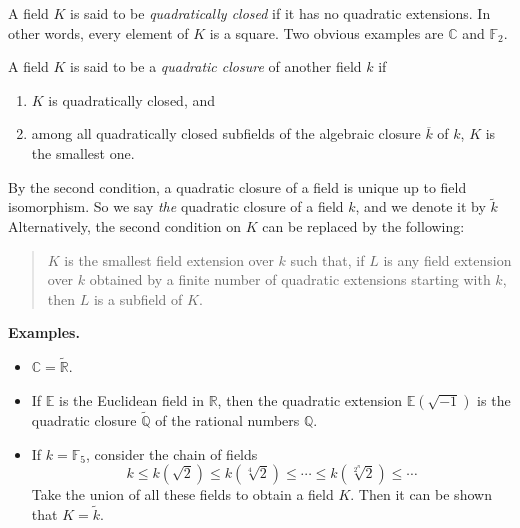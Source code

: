 \documentclass[12pt]{article}
\begin{document}
A field $K$ is said to be \emph{quadratically closed} if it has no quadratic extensions.  In other words, every element of $K$ is a square.  Two obvious examples are $\mathbb{C}$ and $\mathbb{F}_2$.

A field $K$ is said to be a \emph{quadratic closure} of another field $k$ if
\begin{enumerate}
\item $K$ is quadratically closed, and 
\item among all quadratically closed subfields of the algebraic closure $\overline{k}$ of $k$, $K$ is the smallest one.
\end{enumerate}

By the second condition, a quadratic closure of a field is unique up to field isomorphism.  So we say \emph{the} quadratic closure of a field $k$, and we denote it by $\widetilde{k}$ Alternatively, the second condition on $K$ can be replaced by the following:

\begin{quote}
$K$ is the smallest field extension over $k$ such that, if $L$ is any field extension over $k$ obtained by a finite number of quadratic extensions starting with $k$, then $L$ is a subfield of $K$.
\end{quote}

\textbf{Examples.}  
\begin{itemize}
\item $\mathbb{C}=\widetilde{\mathbb{R}}$.  
\item If $\mathbb{E}$ is the Euclidean field in $\mathbb{R}$, then the quadratic extension $\mathbb{E}(\sqrt{-1})$ is the quadratic closure $\widetilde{\mathbb{Q}}$ of the rational numbers $\mathbb{Q}$.
\item If $k=\mathbb{F}_5$, consider the chain of fields
$$k\le k(\sqrt{2})\le k(\sqrt[4]{2})\le \cdots \le k(\sqrt[2^n]{2})\le \cdots $$
Take the union of all these fields to obtain a field $K$.  Then it can be shown that $K=\widetilde{k}$.
\end{itemize}
\end{document}
